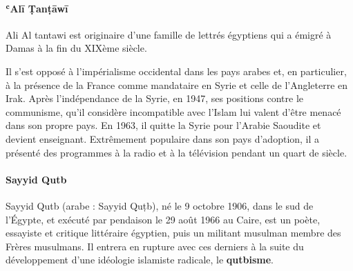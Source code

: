\paragraph{ʿAlī Ṭanṭāwī} \label{theo:AliAlTawani}
{Ali Al tantawi est originaire d'une
famille de lettrés égyptiens qui a émigré à Damas à la fin du XIXème
siècle.


Il s'est opposé à l'impérialisme occidental dans les pays
arabes et, en particulier, à la présence de la France comme mandataire
en Syrie et celle de l'Angleterre en Irak. Après l'indépendance de la
Syrie, en 1947, ses positions contre le communisme, qu'il considère
incompatible avec l'Islam lui valent d'être menacé dans son propre pays.
En 1963, il quitte la Syrie pour l'Arabie Saoudite et devient
enseignant.
Extrêmement populaire dans son pays d'adoption, il a
présenté des programmes à la radio et à la télévision pendant un quart
de
siècle.}

\label{theol:SayyidQutb}
\paragraph{Sayyid Qutb}
Sayyid Qutb (arabe : Sayyid Quṭb), né le 9 octobre 1906, dans le sud de l'Égypte, et exécuté par pendaison le 29 août 1966 au Caire, est un poète, essayiste et critique littéraire égyptien, puis un militant musulman membre des Frères musulmans. Il entrera en rupture avec ces derniers à la suite du développement d'une idéologie islamiste radicale, le \textbf{qutbisme}.


